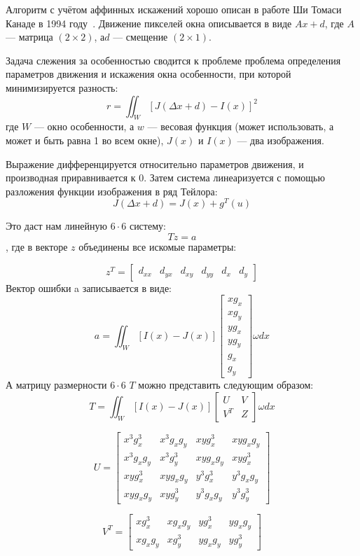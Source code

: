 Алгоритм с учётом аффинных искажений хорошо описан в работе Ши Томаси Канаде в 1994 году~\cite{shi_tom_lyk}. Движение пикселей окна описывается в виде $Ax + d$, где $A$ — матрица $(2 \times 2)$, $а d$ — смещение $(2 \times 1)$.

Задача слежения за особенностью сводится к проблеме проблема определения параметров движения и искажения окна особенности, при которой минимизируется разность:
$$r=\iint_W [J(\Delta x+d)-I(x)]^2$$
где $W$ — окно особенности, а $w$ — весовая функция (может использовать, а может и быть равна 1 во всем окне), $J(x)$ и $I(x)$ — два изображения.

Выражение дифференцируется относительно параметров движения, и производная приравнивается к 0. Затем система линеаризуется с помощью разложения функции изображения в ряд Тейлора:
$$J(\Delta x+d)= J(x)+g^T(u)$$

Это даст нам линейную $6 \cdot 6$ систему:
$$Tz=a$$
, где в векторе $z$ объединены все искомые параметры:

$$z^T=\begin{bmatrix}
 d_{xx} & d_{yx} & d_{xy} & d_{yy} & d_x & d_y
\end{bmatrix}$$
Вектор ошибки a записывается в виде:
$$a=\iint_W [I(x)-J(x)]\begin{bmatrix}
xg_x\\
xg_y\\
yg_x\\
yg_y\\
g_x\\
g_y
\end{bmatrix}\omega dx$$
А матрицу размерности $6 \cdot 6$ $T$ можно представить следующим образом:
$$T=\iint_W [I(x)-J(x)]\begin{bmatrix}
U & V\\
V^T & Z
\end{bmatrix}\omega dx$$

$$U=\begin{bmatrix}
x^3 g^3_x & x^3 g_x g_y & x y g^3_x & x y g_x g_y \\
x^3g_xg_y & x^3g^3_y & xyg_xg_y & xyg^3_x \\
xyg^3_x & xyg_xg_y & y^3g^3_x & y^3g_xg_y \\
xyg_xg_y & xyg^3_y & y^3g_xg_y & y^3g^3_y
\end{bmatrix}$$

$$V^T=\begin{bmatrix}
xg^3_x & xg_xg_y & yg^3_x & yg_xg_y \\
xg_xg_y & xg^3_y & yg_xg_y & yg^3_y
\end{bmatrix}$$

